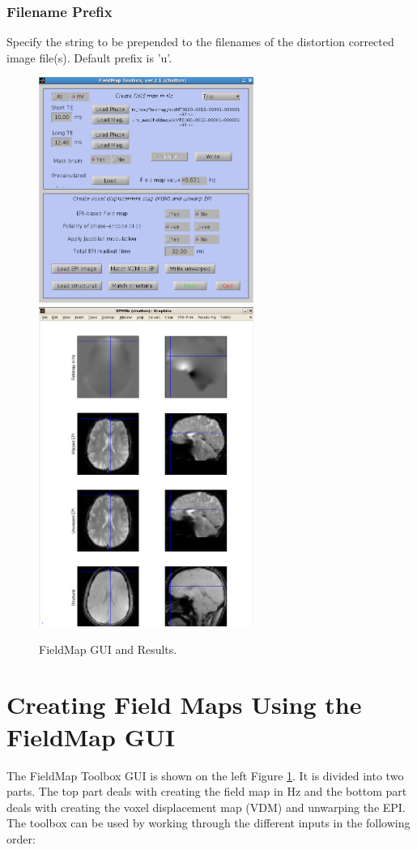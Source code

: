\subsubsection{Filename Prefix}
Specify the string to be prepended to the filenames of the distortion corrected image file(s). Default prefix is 'u'.

\begin{figure}
\begin{center}
\includegraphics[width=70mm]{FieldMap/fieldmap_gui1}
\includegraphics[width=70mm]{FieldMap/fieldmap_results1}
\end{center}
\caption{FieldMap GUI and Results. \label{FM2}}
\end{figure}

\section{Creating Field Maps Using the FieldMap GUI}
The FieldMap Toolbox GUI is shown on the left Figure \ref{FM2}. It is divided into two parts. The top part deals with creating the field map in Hz and the bottom part deals with creating the voxel displacement map (VDM) and unwarping the EPI. The toolbox can be used by working through the different inputs in the following order:


